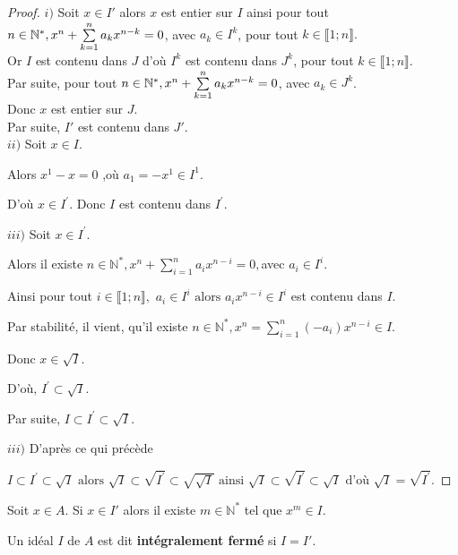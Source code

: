 \begin{proof}
	$i)$ Soit $x \in I'$ alors $x$ est entier sur $I$ ainsi pour tout $n \in \mathbb{N}^*,\\ x^n + \sum\limits_{k=1}^{n} a_k x^{n-k}=0$, avec $a_k \in I^k$, pour tout $k \in \llbracket 1; n \rrbracket.$\\ 
	Or $I $ est contenu dans $ J$ d'où $I^k $ est contenu dans $ J^k$, pour tout $k \in \llbracket 1; n \rrbracket$.\\
	Par suite, pour tout $n \in \mathbb{N}^*,\\ x^n + \sum\limits_{k=1}^{n} a_k x^{n-k}=0$, avec $a_k \in J^k$.\\
	Donc $x$ est entier sur $J$.\\ Par suite, $I' $ est contenu dans $ J'$.\\
	$ii)$ Soit $x\in I.$
	
	Alors $x^{1}-x=0$ ,où $a_{1}=-x^{1}\in I^{1}.$
	
	D'où $x\in I^{\prime }.$ Donc $I$ est contenu dans $ I^{\prime }.$
	
	$iii)$ Soit $x\in I^{\prime }.$
	
	Alors il existe $n\in \mathbb{N}^{\ast },x^{n}+\sum\limits_{i=1}^{n}a_{i}x^{n-i}=0,$avec $a_{i}\in I^{i}.$
	
	Ainsi pour tout $i\in \llbracket 1; n \rrbracket,$ $a_{i}\in I^{i}\text{ alors }
	a_{i}x^{n-i}\in I^{i}$ est contenu dans $ I.$
	
	Par stabilité, il vient, qu'il existe $n\in \mathbb{N}^{\ast },x^{n}=\sum\limits_{i=1}^{n}(-a_{i})x^{n-i}\in I.$
	
	Donc $x\in \sqrt{I}.$
	
	D'où, $I^{\prime }\subset \sqrt{I}.$
	
	Par suite, $I\subset I^{\prime }\subset \sqrt{I}.$
	
	$iii)$ D'après ce qui précède
	
	$I\subset I^{\prime }\subset \sqrt{I}\text{ alors } \sqrt{I}\subset \sqrt{I^{\prime }}\subset \sqrt{\sqrt{I}}\text{ ainsi } \sqrt{I}\subset \sqrt{I^{\prime }}\subset \sqrt{I}\text{ d'où } \sqrt{I}=\sqrt{I^{\prime }}.$
\end{proof}
\begin{maconsequence}
	Soit $x \in A$.
	Si $x \in I'$ alors il existe $m \in \mathbb{N^*}$ tel que $x^m \in I$.
\end{maconsequence}
\begin{madefinition}
	Un idéal $I$ de $A$ est dit \textbf{intégralement fermé} si $I = I'$.
\end{madefinition}

